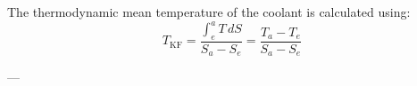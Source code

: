 The thermodynamic mean temperature of the coolant is calculated using:  
\[
T_{\text{KF}} = \frac{\int_{e}^{a} T \, dS}{S_a - S_e} = \frac{T_a - T_e}{S_a - S_e}
\]  

---